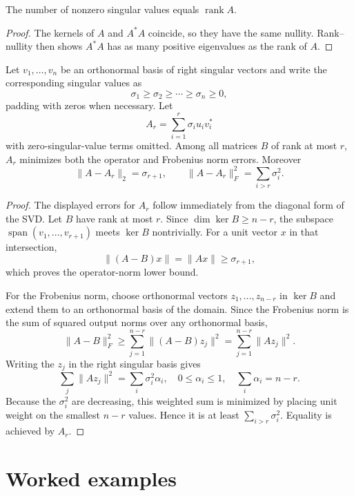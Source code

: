 \begin{theorem}\label{thm:i18-02}
The number of nonzero singular values equals $\operatorname{rank}A$.
\begin{proof}
The kernels of $A$ and $A^*A$ coincide, so they have the same nullity. Rank–nullity then shows $A^*A$ has as many positive eigenvalues as the rank of $A$.
\end{proof}
\end{theorem}

\begin{theorem}\label{thm:i18-03}
Let \(v_1,\ldots,v_n\) be an orthonormal basis of right singular vectors and
write the corresponding singular values as
\[
\sigma_1\ge\sigma_2\ge\cdots\ge\sigma_n\ge0,
\]
padding with zeros when necessary. Let
\[
A_r=\sum_{i=1}^r\sigma_i u_iv_i^*
\]
with zero-singular-value terms omitted. Among all matrices \(B\) of rank at
most \(r\), \(A_r\) minimizes both the operator and Frobenius norm errors.
Moreover
\[
\|A-A_r\|_2=\sigma_{r+1},
\qquad
\|A-A_r\|_F^2=\sum_{i>r}\sigma_i^2.
\]
\begin{proof}
The displayed errors for \(A_r\) follow immediately from the diagonal form of
the SVD. Let \(B\) have rank at most \(r\). Since
\(\dim\ker B\ge n-r\), the subspace
\(\operatorname{span}(v_1,\ldots,v_{r+1})\) meets \(\ker B\) nontrivially.
For a unit vector \(x\) in that intersection,
\[
\|(A-B)x\|=\|Ax\|\ge\sigma_{r+1},
\]
which proves the operator-norm lower bound.

For the Frobenius norm, choose orthonormal vectors
\(z_1,\ldots,z_{n-r}\) in \(\ker B\) and extend them to an orthonormal basis
of the domain. Since the Frobenius norm is the sum of squared output norms over
any orthonormal basis,
\[
\|A-B\|_F^2\ge\sum_{j=1}^{n-r}\|(A-B)z_j\|^2
=\sum_{j=1}^{n-r}\|Az_j\|^2.
\]
Writing the \(z_j\) in the right singular basis gives
\[
\sum_j\|Az_j\|^2=\sum_i\sigma_i^2\alpha_i,
\quad
0\le\alpha_i\le1,
\quad
\sum_i\alpha_i=n-r.
\]
Because the \(\sigma_i^2\) are decreasing, this weighted sum is minimized by
placing unit weight on the smallest \(n-r\) values. Hence it is at least
\(\sum_{i>r}\sigma_i^2\). Equality is achieved by \(A_r\).
\end{proof}
\end{theorem}

\section{Worked examples}

